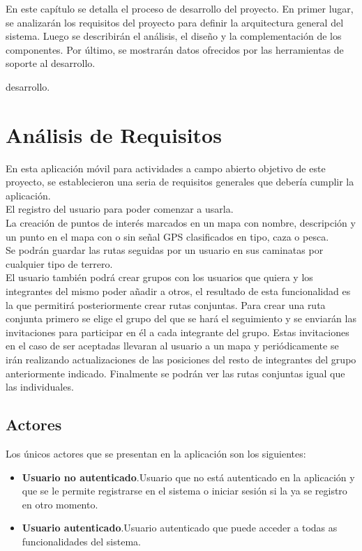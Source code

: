 En este capítulo se detalla el proceso de desarrollo del proyecto. En primer lugar, se analizarán los requisitos del proyecto para definir la arquitectura general del sistema. Luego se describirán el análisis, el diseño y la complementación de los componentes. Por último, se mostrarán datos ofrecidos por las herramientas de soporte al desarrollo.
 
 
 desarrollo.
  
\section{Análisis de Requisitos}


En esta aplicación móvil para actividades a campo abierto objetivo de este proyecto, se establecieron una seria de requisitos generales que debería cumplir la aplicación.\\

El registro del usuario para poder comenzar a usarla.\\

La creación de puntos de interés marcados en un mapa con nombre, descripción y un punto en el mapa con o sin señal GPS clasificados en tipo, caza o pesca. \\

Se podrán guardar las rutas seguidas por un usuario en sus caminatas por cualquier tipo de terrero.\\

El usuario también podrá crear grupos con los usuarios que quiera y los integrantes del mismo poder añadir a otros, el resultado de esta funcionalidad es la que permitirá posteriormente  crear rutas conjuntas. Para crear una ruta conjunta primero se elige el grupo del que se hará el seguimiento y se enviarán  las invitaciones para participar en él a cada integrante del grupo. Estas invitaciones en el caso de ser aceptadas llevaran al usuario a un mapa y periódicamente se irán realizando actualizaciones de las posiciones del resto de integrantes del grupo anteriormente indicado. Finalmente se podrán ver las rutas conjuntas igual que las individuales.
\subsection{Actores}

Los únicos actores que se presentan en la  aplicación son los siguientes:
\begin{itemize}
\item \textbf{Usuario no  autenticado}.Usuario que no está autenticado en la aplicación y que
se le permite registrarse en el  sistema o iniciar sesión si la ya se registro en otro momento.
\item \textbf{Usuario  autenticado}.Usuario autenticado que puede acceder a todas as funcionalidades
del sistema.
\end{itemize}
